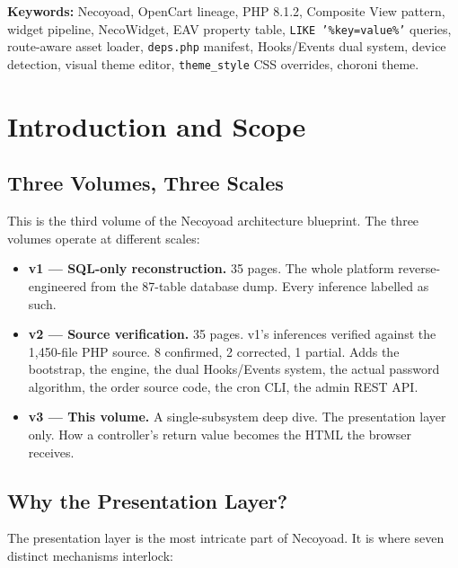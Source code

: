 \documentclass[11pt,a4paper]{article}
\begin{document}
\vspace{0.6em}
\noindent\textbf{Keywords:} Necoyoad, OpenCart lineage, PHP 8.1.2,
Composite View pattern, widget pipeline, NecoWidget, EAV property
table, \texttt{LIKE '\%key=value\%'} queries, route-aware asset
loader, \texttt{deps.php} manifest, Hooks/Events dual system,
device detection, visual theme editor, \texttt{theme\_style} CSS
overrides, choroni theme.

\newpage
\tableofcontents
\newpage

\section{Introduction and Scope}\label{sec:intro}

\subsection{Three Volumes, Three Scales}

This is the third volume of the Necoyoad architecture blueprint.
The three volumes operate at different scales:

\begin{itemize}[leftmargin=1.6em,itemsep=2pt]
  \item \textbf{v1 --- SQL-only reconstruction.} 35 pages. The whole
        platform reverse-engineered from the 87-table database dump.
        Every inference labelled as such.
  \item \textbf{v2 --- Source verification.} 35 pages. v1's inferences
        verified against the 1,450-file PHP source. 8 confirmed,
        2 corrected, 1 partial. Adds the bootstrap, the engine, the
        dual Hooks/Events system, the actual password algorithm, the
        order source code, the cron CLI, the admin REST API.
  \item \textbf{v3 --- This volume.} A single-subsystem deep dive.
        The presentation layer only. How a controller's return value
        becomes the HTML the browser receives.
\end{itemize}

\subsection{Why the Presentation Layer?}

The presentation layer is the most intricate part of Necoyoad. It is
where seven distinct mechanisms interlock:
\end{document}
